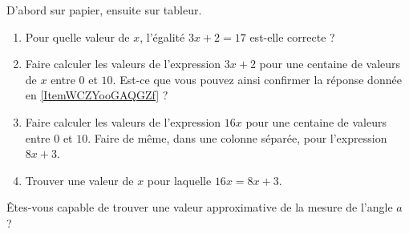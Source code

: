
\begin{exercice}\label{exo2smath-0230}

    D'abord sur papier, ensuite sur tableur.
    \begin{enumerate}
        \item   \label{ItemWCZYooGAQGZf}
            Pour quelle valeur de \( x\), l'égalité \( 3x+2=17\) est-elle correcte ?
        \item
            Faire calculer les valeurs de l'expression \( 3x+2\) pour une centaine de valeurs de \( x\) entre \( 0\) et \( 10\). Est-ce que vous pouvez ainsi confirmer la réponse donnée en \ref{ItemWCZYooGAQGZf} ?
        \item
            Faire calculer les valeurs de l'expression \( 16x\) pour une centaine de valeurs entre \( 0\) et \( 10\). Faire de même, dans une colonne séparée, pour l'expression \( 8x+3\).
        \item
            Trouver une valeur de \( x\) pour laquelle \( 16x=8x+3\).
    \end{enumerate}
    Êtes-vous capable de trouver une valeur approximative de la mesure de l'angle \( a\) ?

\begin{center}
    
\end{center}

\end{exercice}
